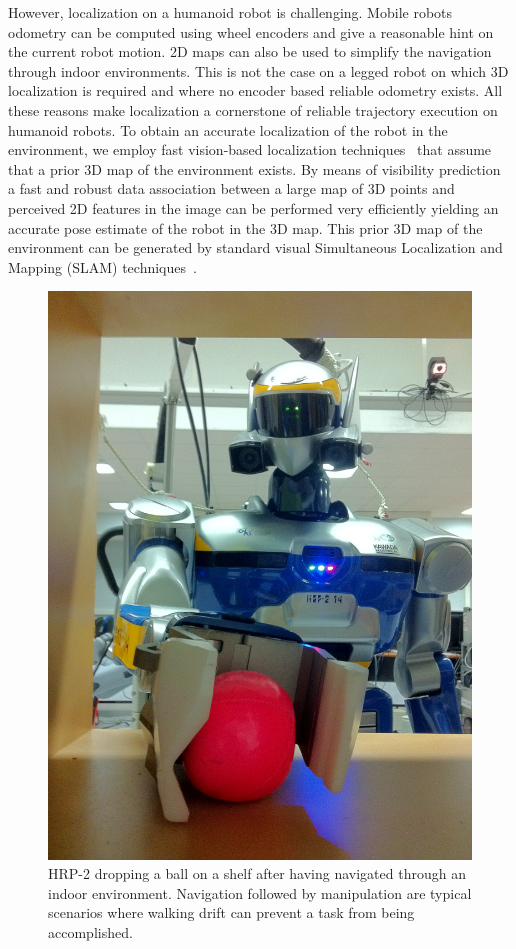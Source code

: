 However, localization on a humanoid robot is challenging. Mobile robots odometry can be computed using wheel encoders and give a reasonable hint on the current robot motion. 2D maps can also be used to simplify the navigation through indoor environments. This is not the case on a legged robot on which 3D localization is required and where no encoder based reliable odometry exists. All these reasons make localization a cornerstone of reliable trajectory execution on humanoid robots. To obtain an accurate localization of the robot in the environment, we employ fast vision-based localization techniques~\cite{Alcantarilla12auro} that assume that a prior 3D map of the environment exists. By means of visibility prediction~\cite{Alcantarilla11icra} a fast and robust data association between a large map of 3D points and perceived 2D features in the image can be performed very efficiently yielding an accurate pose estimate of the robot in the 3D map. This prior 3D map of the environment can be generated by standard visual Simultaneous Localization and Mapping (SLAM) techniques~\cite{Davison07pami,Konolige08tro}.
%
\begin{figure}[ht]
  \begin{center}
    \includegraphics[width=.9\linewidth]{images/demo1.jpg}
  \end{center}
  \caption{HRP-2 dropping a ball on a shelf after having navigated through an indoor environment. Navigation followed by manipulation are typical scenarios where walking drift can prevent a task from being accomplished.\label{fig:xp_final}}
\end{figure}
%


